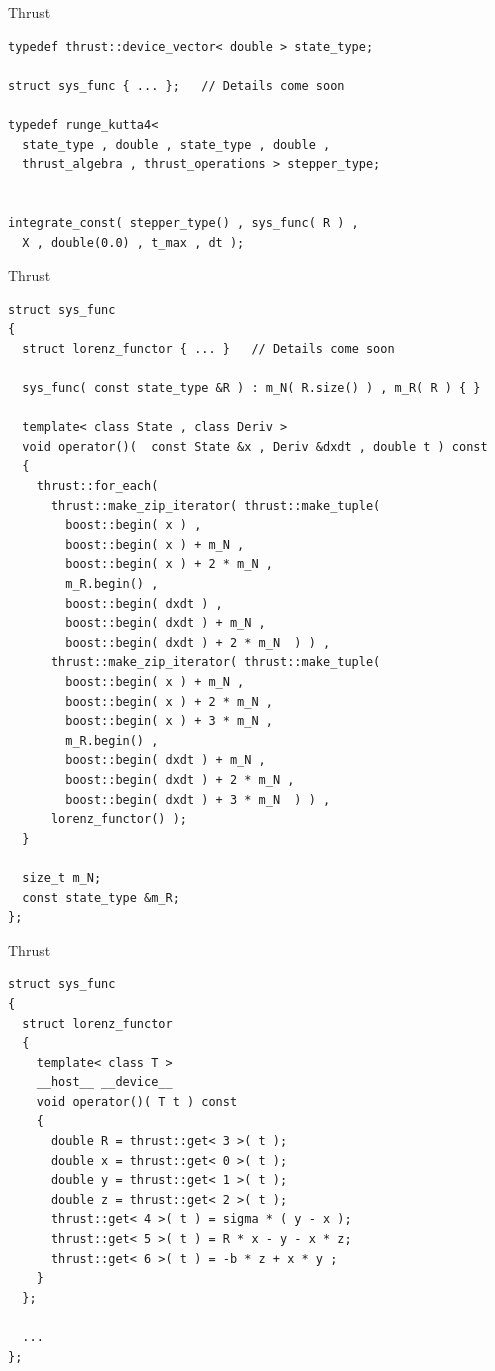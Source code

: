 \documentclass{beamer}
\newcommand{\heading}[1]{\centerline{\Large #1} \vspace{0.5em}}
\begin{document}
\begin{frame}[fragile]
 \heading{Thrust}


\begin{lstlisting}[basicstyle=\scriptsize\ttfamily]
typedef thrust::device_vector< double > state_type;

struct sys_func { ... };   // Details come soon

typedef runge_kutta4<
  state_type , double , state_type , double ,
  thrust_algebra , thrust_operations > stepper_type;


integrate_const( stepper_type() , sys_func( R ) ,
  X , double(0.0) , t_max , dt );
\end{lstlisting}

\end{frame}



\begin{frame}[fragile]
 \heading{Thrust}


\begin{lstlisting}[basicstyle=\tiny\ttfamily]
struct sys_func
{
  struct lorenz_functor { ... }   // Details come soon

  sys_func( const state_type &R ) : m_N( R.size() ) , m_R( R ) { }

  template< class State , class Deriv >
  void operator()(  const State &x , Deriv &dxdt , double t ) const
  {
    thrust::for_each(
      thrust::make_zip_iterator( thrust::make_tuple(
        boost::begin( x ) ,
        boost::begin( x ) + m_N ,
        boost::begin( x ) + 2 * m_N ,
        m_R.begin() ,
        boost::begin( dxdt ) ,
        boost::begin( dxdt ) + m_N ,
        boost::begin( dxdt ) + 2 * m_N  ) ) ,
      thrust::make_zip_iterator( thrust::make_tuple(
        boost::begin( x ) + m_N ,
        boost::begin( x ) + 2 * m_N ,
        boost::begin( x ) + 3 * m_N ,
        m_R.begin() ,
        boost::begin( dxdt ) + m_N ,
        boost::begin( dxdt ) + 2 * m_N ,
        boost::begin( dxdt ) + 3 * m_N  ) ) ,
      lorenz_functor() );
  }

  size_t m_N;
  const state_type &m_R;
};
\end{lstlisting}

\end{frame}



\begin{frame}[fragile]
 \heading{Thrust}


\begin{lstlisting}[basicstyle=\tiny\ttfamily]
struct sys_func
{
  struct lorenz_functor
  {
    template< class T >
    __host__ __device__
    void operator()( T t ) const
    {
      double R = thrust::get< 3 >( t );
      double x = thrust::get< 0 >( t );
      double y = thrust::get< 1 >( t );
      double z = thrust::get< 2 >( t );
      thrust::get< 4 >( t ) = sigma * ( y - x );
      thrust::get< 5 >( t ) = R * x - y - x * z;
      thrust::get< 6 >( t ) = -b * z + x * y ;
    }
  };

  ...
};
\end{lstlisting}

\end{frame}
\end{document}

